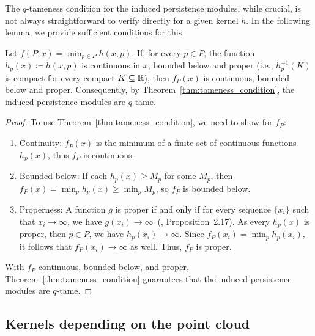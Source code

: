 The $q$-tameness condition for the induced persistence modules, while crucial,
is not always straightforward to verify directly for a given kernel $h$. In the
following lemma, we provide sufficient conditions for this.
\begin{lemma}
    Let $f(P, x) = \min_{p \in P} h(x, p)$. If, for every $p \in P$,
    the function $h_p(x) \coloneqq h(x, p)$ is continuous in $x$,
    bounded below and proper (i.e., $h_p^{-1}(K)$ is compact for every compact
    $K \subseteq \mathbb{R}$), then $f_P(x)$ is continuous, bounded below and proper.
    Consequently, by Theorem~\ref{thm:tameness_condition}, the induced
    persistence modules are $q$-tame.
\end{lemma}
\begin{proof}
    To use Theorem~\ref{thm:tameness_condition}, we need to show for $f_P$:
    \begin{enumerate}
        \item Continuity: $f_P(x)$ is the minimum of a finite set of continuous
            functions $h_p(x)$, thus $f_P$ is continuous.
        \item Bounded below: If each $h_p(x) \geq M_p$ for some $M_p$,
            then $f_P(x) = \min_p h_p(x) \geq \min_p M_p$, so $f_P$ is bounded
            below.
        \item Properness: A function $g$ is proper if and only if for every
            sequence $\{x_i\}$ such that $x_i \to \infty$, we have
            $g(x_i) \to \infty$~(\cite{lee2003smooth}, Proposition~2.17).
            As every $h_p(x)$ is proper, then $p\in P$, we have
            $h_p(x_i) \to \infty$. Since $f_P(x_i) = \min_p h_p(x_i)$, it follows
            that $f_P(x_i) \to \infty$ as well. Thus, $f_P$ is proper.
    \end{enumerate}
    With $f_P$ continuous, bounded below, and proper,
    Theorem~\ref{thm:tameness_condition} guarantees that the induced persistence
    modules are $q$-tame.
\end{proof}

\subsection{Kernels depending on the point cloud}

